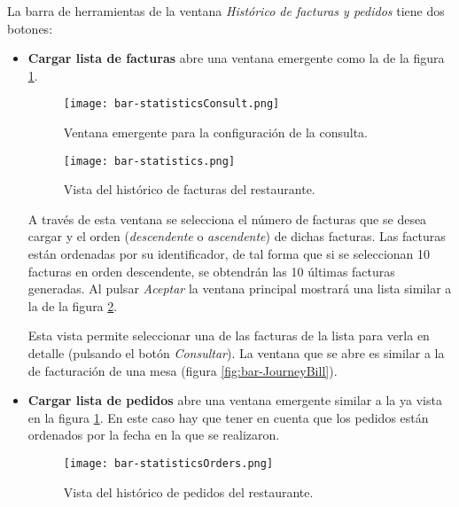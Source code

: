 La barra de herramientas de la ventana \emph{Histórico de facturas y pedidos}
tiene dos botones:
\begin{itemize}
\item \textbf{Cargar lista de facturas} abre una ventana emergente como
la de la figura \ref{fig:bar-statisticsConsult}. 

  \begin{figure}[H]
    \begin{center}
      \texttt{[image: bar-statisticsConsult.png]}
      \caption{Ventana emergente para la configuración de la consulta.}
      \label{fig:bar-statisticsConsult}
    \end{center}
  \end{figure}

  \begin{figure}[H]
    \begin{center}
      \texttt{[image: bar-statistics.png]}
      \caption{Vista del histórico de facturas del restaurante.}
      \label{fig:bar-statistics}
    \end{center}
  \end{figure}

A través de esta ventana se selecciona el número de facturas que se desea 
cargar y el orden (\emph{descendente} o \emph{ascendente}) de dichas facturas. 
Las facturas están ordenadas por su identificador, de tal forma que si se 
seleccionan 10 facturas en orden descendente, se obtendrán las 10 últimas 
facturas generadas. Al pulsar \emph{Aceptar} la ventana principal mostrará
una lista similar a la de la figura \ref{fig:bar-statistics}.

Esta vista permite seleccionar una de las facturas de la lista para verla en
detalle (pulsando el botón \emph{Consultar}). La ventana que se abre es
similar a la de facturación de una mesa (figura \ref{fig:bar-JourneyBill}).

\item \textbf{Cargar lista de pedidos} abre una ventana emergente similar a
la ya vista en la figura \ref{fig:bar-statisticsConsult}. En este caso
hay que tener en cuenta que los pedidos están ordenados por la fecha en la
que se realizaron.

  \begin{figure}[H]
    \begin{center}
      \texttt{[image: bar-statisticsOrders.png]}
      \caption{Vista del histórico de pedidos del restaurante.}
      \label{fig:bar-statisticsOrders}
    \end{center}
  \end{figure}
\end{itemize}

